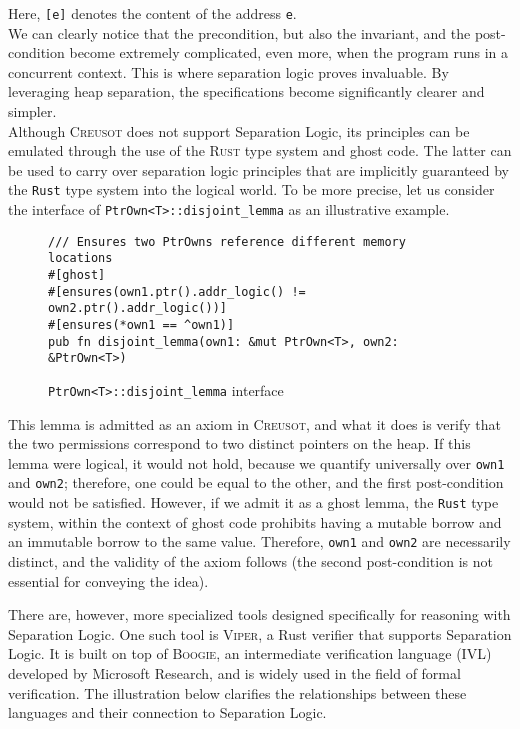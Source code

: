 \documentclass[11pt,a4paper]{report}
\begin{document}
Here, \texttt{[e]} denotes the content of the address \texttt{e}.\\
We can clearly notice that the precondition, but also the invariant, and the post-condition become extremely complicated, even more, when the program runs in a concurrent context. This is where separation logic proves invaluable. By leveraging heap separation, the specifications become significantly clearer and simpler.\\

Although \textsc{Creusot} does not support Separation Logic, its principles can be emulated through the use of the \textsc{Rust} type system and ghost code.
The latter can be used to carry over separation logic principles that are implicitly guaranteed by the \texttt{Rust} type system into the logical world. To be more precise, let us consider the interface of \texttt{PtrOwn<T>::disjoint\_lemma} as an illustrative example.

\begin{figure}[h]
\centering
\begin{minipage}{0.9\linewidth}
\begin{verbatim}
/// Ensures two PtrOwns reference different memory locations
#[ghost]
#[ensures(own1.ptr().addr_logic() != own2.ptr().addr_logic())]
#[ensures(*own1 == ^own1)]
pub fn disjoint_lemma(own1: &mut PtrOwn<T>, own2: &PtrOwn<T>)
\end{verbatim}
\caption{\texttt{PtrOwn<T>::disjoint\_lemma} interface}
\end{minipage}
\end{figure}

This lemma is admitted as an axiom in \textsc{Creusot}, and what it does is verify that the two permissions correspond to two distinct pointers on the heap.
If this lemma were logical, it would not hold, because we quantify universally over \texttt{own1} and \texttt{own2}; therefore, one could be equal to the other, and the first post-condition would not be satisfied.
However, if we admit it as a ghost lemma, the \texttt{Rust} type system, within the context of ghost code prohibits having a mutable borrow and an immutable borrow to the same value.
Therefore, \texttt{own1} and \texttt{own2} are necessarily distinct, and the validity of the axiom follows (the second post-condition is not essential for conveying the idea).

There are, however, more specialized tools designed specifically for reasoning with Separation Logic. One such tool is \textsc{Viper}, a Rust verifier that supports Separation Logic. It is built on top of \textsc{Boogie}, an intermediate verification language (IVL) developed by Microsoft Research, and is widely used in the field of formal verification. The illustration below clarifies the relationships between these languages and their connection to Separation Logic.
\end{document}
